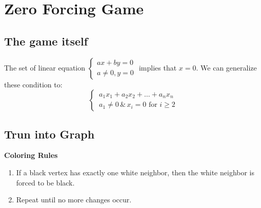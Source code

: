 \documentclass[11pt]{article}
\begin{document}
\section{Zero Forcing Game}
\subsection{The game itself}
The set of linear equation 
$\begin{cases}
    ax+by=0\\
    a\neq 0, y= 0
\end{cases}$ implies that $x=0$. We can generalize these condition to: 
\[
    \begin{cases}
        \displaystyle
        \,a_1x_1+a_2x_2+\dots+a_nx_n\\
        \displaystyle
        \,a_1 \neq 0 \, \& \, x_i = 0 \text{ for } i \geq 2
    \end{cases}
\]
\subsection{Trun into Graph}
\vspace{10pt}
\begin{minipage}{.3\textwidth}
    \centering
\end{minipage}
\hfill
\begin{minipage}{.6\textwidth}
    \vspace{0pt}
    \textbf{Coloring Rules}
    \begin{enumerate}
        \item If a black vertex has exactly one white neighbor, then the white neighbor is forced to be black.
        \item Repeat until no more changes occur.
    \end{enumerate}
\end{minipage}
\end{document}
